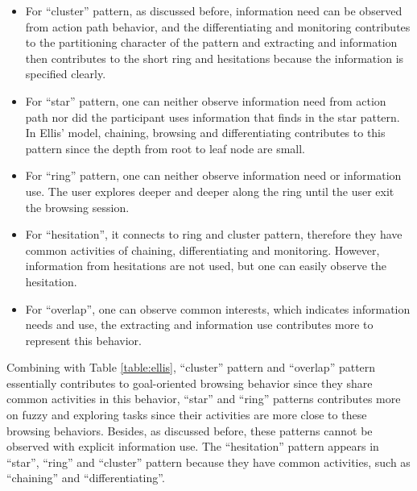 \begin{itemize}
    \item For ``cluster'' pattern, as discussed before, 
    information need can be observed from action path behavior,
    and the differentiating and monitoring contributes to the partitioning character 
    of the pattern and extracting and information then contributes to 
    the short ring and hesitations because the information is specified clearly.
    \item For ``star'' pattern, one can neither observe information need from action path 
    nor did the participant uses information that finds in the star pattern. 
    In Ellis' model, chaining, browsing and differentiating contributes to this pattern 
    since the depth from root to leaf node are small.
    \item For ``ring'' pattern, one can neither observe information need or information use. 
    The user explores deeper and deeper along the ring until the user exit the browsing session.
    \item For ``hesitation'', it connects to ring and cluster pattern, 
    therefore they have common activities of chaining, differentiating and monitoring.
    However, information from hesitations are not used, but one can easily observe the hesitation.
    \item For ``overlap'', one can observe common interests, which indicates information needs 
    and use, the extracting and information use contributes more to represent this behavior.
\end{itemize}

Combining with Table \ref{table:ellis}, ``cluster'' pattern and ``overlap'' pattern 
essentially contributes to goal-oriented browsing behavior since they share common activities 
in this behavior, 
``star'' and ``ring'' patterns contributes more on fuzzy and exploring tasks 
since their activities are more close to these browsing behaviors. 
Besides, as discussed before, these patterns cannot be observed with explicit information use.
The ``hesitation'' pattern appears in ``star'', ``ring'' and ``cluster'' pattern 
because they have common activities, such as ``chaining'' and ``differentiating''.

\cleardoublepage